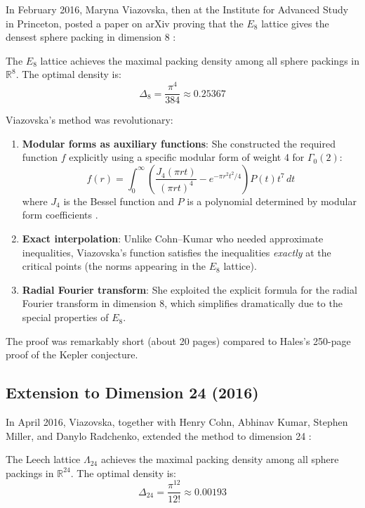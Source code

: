 In February 2016, Maryna Viazovska, then at the Institute for Advanced Study in Princeton, posted a paper on arXiv proving that the $E_8$ lattice gives the densest sphere packing in dimension 8 \cite{viazovska2017}:

\begin{theorem}
The $E_8$ lattice achieves the maximal packing density among all sphere packings in $\mathbb{R}^8$. The optimal density is:
\begin{equation}
\Delta_8 = \frac{\pi^4}{384} \approx 0.25367
\end{equation}
\end{theorem}

Viazovska's method was revolutionary:

\begin{enumerate}
\item \textbf{Modular forms as auxiliary functions}: She constructed the required function $f$ explicitly using a specific modular form of weight 4 for $\Gamma_0(2)$:
\begin{equation}
f(r) = \int_0^\infty \left(\frac{J_4(\pi r t)}{(\pi r t)^4} - e^{-\pi r^2 t^2/4}\right) P(t) t^7 \, dt
\end{equation}
where $J_4$ is the Bessel function and $P$ is a polynomial determined by modular form coefficients \cite{viazovska2017}.
\item \textbf{Exact interpolation}: Unlike Cohn--Kumar who needed approximate inequalities, Viazovska's function satisfies the inequalities \emph{exactly} at the critical points (the norms appearing in the $E_8$ lattice).
\item \textbf{Radial Fourier transform}: She exploited the explicit formula for the radial Fourier transform in dimension 8, which simplifies dramatically due to the special properties of $E_8$.
\end{enumerate}

The proof was remarkably short (about 20 pages) compared to Hales's 250-page proof of the Kepler conjecture.

\subsection{Extension to Dimension 24 (2016)}

In April 2016, Viazovska, together with Henry Cohn, Abhinav Kumar, Stephen Miller, and Danylo Radchenko, extended the method to dimension 24 \cite{cohn2017}:

\begin{theorem}
The Leech lattice $\Lambda_{24}$ achieves the maximal packing density among all sphere packings in $\mathbb{R}^{24}$. The optimal density is:
\begin{equation}
\Delta_{24} = \frac{\pi^{12}}{12!} \approx 0.00193
\end{equation}
\end{theorem}

